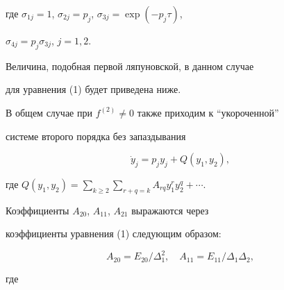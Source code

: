 где $\sigma_{1j}=1$, $\sigma_{2j}=p_j$, $\sigma_{3j}=\exp(-p_j\tau)$, 


$\sigma_{4j}=p_j\sigma_{3j}$, $j=1,2$. 


Величина, подобная первой ляпуновской, в данном случае 


для уравнения (1) будет приведена ниже. 


 


В общем случае при $f^{(2)}\ne0$ также приходим к ``укороченной'' 


системе второго порядка без запаздывания 


\begin{equation} 


\Dot y_j=p_j y_j+Q(y_1,y_2), 


\end{equation} 


где $Q(y_1,y_2)=\sum\limits_{k\ge2} 


\sum\limits_{r+q=k}A_{rq}y^r_1y^q_2+\dotsb$. 


 


Коэффициенты $A_{20}$, $A_{11}$, $A_{21}$ выражаются через 


коэффициенты уравнения (1) следующим образом: 


$$ 


A_{20}=E_{20}/\Delta^2_1,\quad 


A_{11}=E_{11}/\Delta_1\Delta_2, 


$$ 


где 


